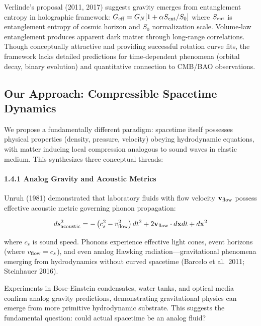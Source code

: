 \documentclass[11pt,a4paper]{article}
\begin{document}
Verlinde's proposal (2011, 2017) suggests gravity emerges from
entanglement entropy in holographic framework:
\(G_{\rm eff} = G_N[1 + \alpha S_{\rm ent}/S_0]\) where \(S_{\rm ent}\)
is entanglement entropy of cosmic horizon and \(S_0\) normalization
scale. Volume-law entanglement produces apparent dark matter through
long-range correlations. Though conceptually attractive and providing
successful rotation curve fits, the framework lacks detailed predictions
for time-dependent phenomena (orbital decay, binary evolution) and
quantitative connection to CMB/BAO observations.

\hypertarget{our-approach-compressible-spacetime-dynamics}{%
\subsection{Our Approach: Compressible Spacetime
Dynamics}\label{our-approach-compressible-spacetime-dynamics}}

We propose a fundamentally different paradigm: spacetime itself
possesses physical properties (density, pressure, velocity) obeying
hydrodynamic equations, with matter inducing local compression analogous
to sound waves in elastic medium. This synthesizes three conceptual
threads:

\hypertarget{analog-gravity-and-acoustic-metrics}{%
\paragraph{1.4.1 Analog Gravity and Acoustic
Metrics}\label{analog-gravity-and-acoustic-metrics}}

Unruh (1981) demonstrated that laboratory fluids with flow velocity
\({\bf v}_{\rm flow}\) possess effective acoustic metric governing
phonon propagation:

\[ds^2_{\rm acoustic} = -\left(c_s^2 - v_{\rm flow}^2\right)dt^2 + 2{\bf v}_{\rm flow} \cdot d{\bf x} dt + d{\bf x}^2\]

where \(c_s\) is sound speed. Phonons experience effective light cones,
event horizons (where \(v_{\rm flow} = c_s\)), and even analog Hawking
radiation---gravitational phenomena emerging from hydrodynamics without
curved spacetime (Barcelo et al.~2011; Steinhauer 2016).

Experiments in Bose-Einstein condensates, water tanks, and optical media
confirm analog gravity predictions, demonstrating gravitational physics
can emerge from more primitive hydrodynamic substrate. This suggests the
fundamental question: could actual spacetime be an analog fluid?
\end{document}

